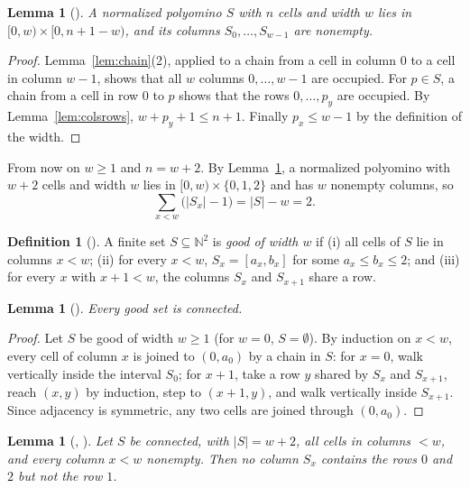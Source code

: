 \documentclass[11pt]{amsart}
\theoremstyle{plain}
\newtheorem{lemma}[theorem]{Lemma}
\theoremstyle{definition}
\newtheorem{definition}[theorem]{Definition}
\newcommand{\N}{\mathbb{N}}
\begin{document}
\begin{lemma}[]\label{lem:box}
A normalized polyomino $S$ with $n$ cells and width $w$ lies in $[0,w)\times[0,n+1-w)$, and its columns $S_0,\dots,S_{w-1}$ are nonempty.
\end{lemma}

\begin{proof}
Lemma~\ref{lem:chain}(2), applied to a chain from a cell in column $0$ to a cell in column $w-1$, shows that all $w$ columns $0,\dots,w-1$ are occupied. For $p\in S$, a chain from a cell in row $0$ to $p$ shows that the rows $0,\dots,p_y$ are occupied. By Lemma~\ref{lem:colsrows}, $w+p_y+1\le n+1$. Finally $p_x\le w-1$ by the definition of the width.
\end{proof}

From now on $w\ge1$ and $n=w+2$. By Lemma~\ref{lem:box}, a normalized polyomino with $w+2$ cells and width $w$ lies in $[0,w)\times\{0,1,2\}$ and has $w$ nonempty columns, so
\begin{equation}\label{eq:excess}
  \textstyle\sum_{x<w}\bigl(|S_x|-1\bigr)=|S|-w=2.
\end{equation}

\begin{definition}[]\label{def:good}
A finite set $S\subseteq\N^2$ is \emph{good of width $w$} if (i) all cells of $S$ lie in columns $x<w$; (ii) for every $x<w$, $S_x=[a_x,b_x]$ for some $a_x\le b_x\le2$; and (iii) for every $x$ with $x+1<w$, the columns $S_x$ and $S_{x+1}$ share a row.
\end{definition}

\begin{lemma}[]\label{lem:goodconn}
Every good set is connected.
\end{lemma}

\begin{proof}
Let $S$ be good of width $w\ge1$ (for $w=0$, $S=\emptyset$). By induction on $x<w$, every cell of column $x$ is joined to $(0,a_0)$ by a chain in $S$: for $x=0$, walk vertically inside the interval $S_0$; for $x+1$, take a row $y$ shared by $S_x$ and $S_{x+1}$, reach $(x,y)$ by induction, step to $(x+1,y)$, and walk vertically inside $S_{x+1}$. Since adjacency is symmetric, any two cells are joined through $(0,a_0)$.
\end{proof}

\begin{lemma}[, ]\label{lem:nogap}
Let $S$ be connected, with $|S|=w+2$, all cells in columns $<w$, and every column $x<w$ nonempty. Then no column $S_x$ contains the rows $0$ and $2$ but not the row $1$.
\end{lemma}
\end{document}
